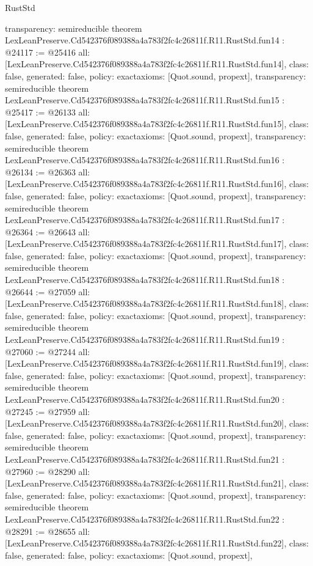 \begin{lexlean}{RustStd}
\begin{coremodule}
{  transparency: semireducible
}
theorem LexLeanPreserve.Cd542376f089388a4a783f2fc4c26811f.R11.RustStd.fun14 : @24117 := @25416 {
  all: [LexLeanPreserve.Cd542376f089388a4a783f2fc4c26811f.R11.RustStd.fun14],
  class: false,
  generated: false,
  policy: exact{axioms: [Quot.sound, propext]},
  transparency: semireducible
}
theorem LexLeanPreserve.Cd542376f089388a4a783f2fc4c26811f.R11.RustStd.fun15 : @25417 := @26133 {
  all: [LexLeanPreserve.Cd542376f089388a4a783f2fc4c26811f.R11.RustStd.fun15],
  class: false,
  generated: false,
  policy: exact{axioms: [Quot.sound, propext]},
  transparency: semireducible
}
theorem LexLeanPreserve.Cd542376f089388a4a783f2fc4c26811f.R11.RustStd.fun16 : @26134 := @26363 {
  all: [LexLeanPreserve.Cd542376f089388a4a783f2fc4c26811f.R11.RustStd.fun16],
  class: false,
  generated: false,
  policy: exact{axioms: [Quot.sound, propext]},
  transparency: semireducible
}
theorem LexLeanPreserve.Cd542376f089388a4a783f2fc4c26811f.R11.RustStd.fun17 : @26364 := @26643 {
  all: [LexLeanPreserve.Cd542376f089388a4a783f2fc4c26811f.R11.RustStd.fun17],
  class: false,
  generated: false,
  policy: exact{axioms: [Quot.sound, propext]},
  transparency: semireducible
}
theorem LexLeanPreserve.Cd542376f089388a4a783f2fc4c26811f.R11.RustStd.fun18 : @26644 := @27059 {
  all: [LexLeanPreserve.Cd542376f089388a4a783f2fc4c26811f.R11.RustStd.fun18],
  class: false,
  generated: false,
  policy: exact{axioms: [Quot.sound, propext]},
  transparency: semireducible
}
theorem LexLeanPreserve.Cd542376f089388a4a783f2fc4c26811f.R11.RustStd.fun19 : @27060 := @27244 {
  all: [LexLeanPreserve.Cd542376f089388a4a783f2fc4c26811f.R11.RustStd.fun19],
  class: false,
  generated: false,
  policy: exact{axioms: [Quot.sound, propext]},
  transparency: semireducible
}
theorem LexLeanPreserve.Cd542376f089388a4a783f2fc4c26811f.R11.RustStd.fun20 : @27245 := @27959 {
  all: [LexLeanPreserve.Cd542376f089388a4a783f2fc4c26811f.R11.RustStd.fun20],
  class: false,
  generated: false,
  policy: exact{axioms: [Quot.sound, propext]},
  transparency: semireducible
}
theorem LexLeanPreserve.Cd542376f089388a4a783f2fc4c26811f.R11.RustStd.fun21 : @27960 := @28290 {
  all: [LexLeanPreserve.Cd542376f089388a4a783f2fc4c26811f.R11.RustStd.fun21],
  class: false,
  generated: false,
  policy: exact{axioms: [Quot.sound, propext]},
  transparency: semireducible
}
theorem LexLeanPreserve.Cd542376f089388a4a783f2fc4c26811f.R11.RustStd.fun22 : @28291 := @28655 {
  all: [LexLeanPreserve.Cd542376f089388a4a783f2fc4c26811f.R11.RustStd.fun22],
  class: false,
  generated: false,
  policy: exact{axioms: [Quot.sound, propext]},
}
\end{coremodule}
\end{lexlean}
